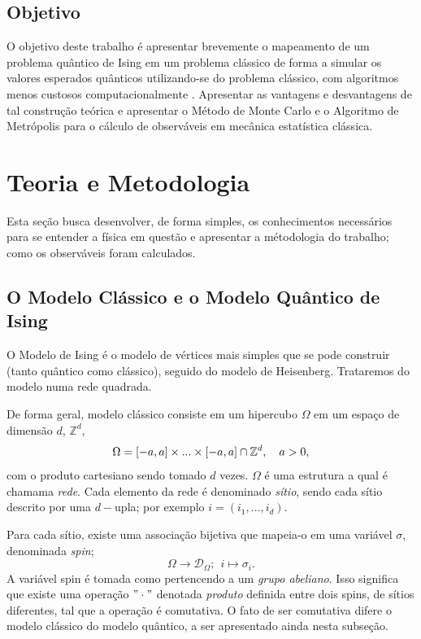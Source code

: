 \subsection{Objetivo}
\label{subsec:Objetivo}
O objetivo deste trabalho é apresentar brevemente o mapeamento de um problema quântico de Ising em um problema clássico de forma a simular os valores esperados quânticos utilizando-se do problema clássico, com algoritmos menos custosos computacionalmente \cite{IsingSim}. Apresentar as vantagens e desvantagens de tal construção teórica e apresentar o Método de Monte Carlo e o Algoritmo de Metrópolis para o cálculo de observáveis em mecânica estatística clássica. 

\section{Teoria e Metodologia}
\label{sec:TeoriaEMetodologia}
Esta seção busca desenvolver, de forma simples, os conhecimentos necessários para se entender a física em questão e apresentar a métodologia do trabalho; como os observáveis foram calculados. 

\subsection{O Modelo Clássico e o Modelo Quântico de Ising}
\label{subsec:OModeloClassicoeoModeloQuantico}

O Modelo de Ising é o modelo de vértices mais simples que se pode construir (tanto quântico como clássico), seguido do modelo de Heisenberg. Trataremos do modelo numa rede quadrada.

De forma geral, modelo clássico consiste em um hipercubo $\Omega$ em um espaço de dimensão $d$, $\mathbb{Z}^d$,
\begin{equation*}
	\Omega = [-a, a] \times ... \times [-a, a] \cap \mathbb{Z}^d \qc a > 0,
\end{equation*}
com o produto cartesiano sendo tomado $d$ vezes. $\Omega$ é uma estrutura a qual é chamama \textit{rede}. Cada elemento da rede é denominado \textit{sítio}, sendo cada sítio descrito por uma $d-$upla; por exemplo $i = (i_1, ..., i_d)$. 

Para cada sítio, existe uma associação bijetiva que mapeia-o em uma variável $\sigma$, denominada \textit{spin};
\begin{equation*}
	\Omega \to \mathcal{D}_\Omega; \ \ i \mapsto \sigma_i.
\end{equation*}
A variável spin é tomada como pertencendo a um \textit{grupo abeliano}. Isso significa que existe uma operação $"\cdot"$ denotada \textit{produto} definida entre dois spins, de sítios diferentes, tal que a operação é comutativa. O fato de ser comutativa difere o modelo clássico do modelo quântico, a ser apresentado ainda nesta subseção.

